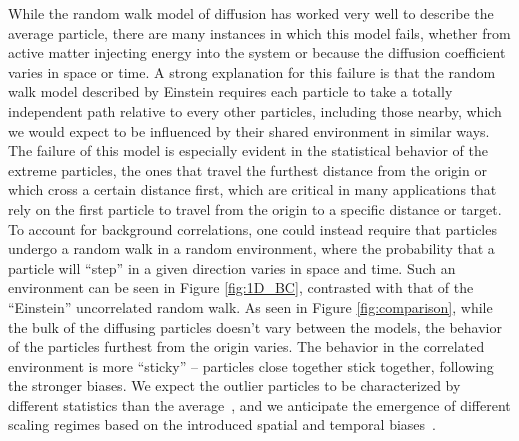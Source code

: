 While the random walk model of diffusion has worked very well to describe the average particle, there are many instances in which this model fails, whether from active matter injecting energy into the system or because the diffusion coefficient varies in space or time.
A strong explanation for this failure is that the random walk model described by Einstein requires each particle to take a totally independent path relative to every other particles, including those nearby, which we would expect to be influenced by their shared environment in similar ways.
The failure of this model is especially evident in the statistical behavior of the extreme particles, the ones that travel the furthest distance from the origin or which cross a certain distance first, which are critical in many applications that rely on the first particle to travel from the origin to a specific distance or target.
To account for background correlations, one could instead require that particles undergo a random walk in a random environment, where the probability that a particle will ``step'' in a given direction varies in space and time. Such an environment can be seen in Figure \ref{fig:1D_BC}, contrasted with that of the ``Einstein'' uncorrelated random walk. 
As seen in Figure \ref{fig:comparison}, while the bulk of the diffusing particles doesn't vary between the models, the behavior of the particles furthest from the origin varies. The behavior in the correlated environment is more ``sticky'' -- particles close together stick together, following the stronger biases. We expect the outlier particles to be characterized by different statistics than the average~\cite{lawley_distribution_2020,lawley_probabilistic_2020,lawley_universal_2020}, and we  anticipate the emergence of different scaling regimes based on the introduced spatial and temporal biases~\cite{barraquand_random-walk_2017,le_doussal_diffusion_2017}.

